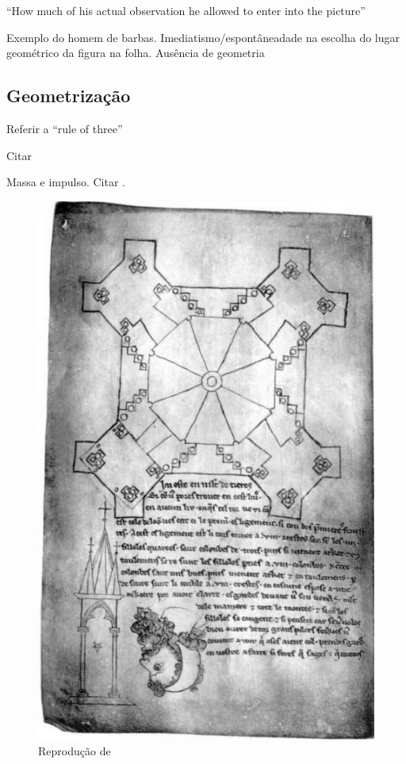 \documentclass{article}
\begin{document}
\cite{gombrich} ``How much of his actual observation he allowed to
enter into the picture''

Exemplo do homem de barbas. Imediatismo/espontâneadade na escolha do
lugar geométrico da figura na folha. Ausência de geometria 

\subsection{Geometrização}

Referir a ``rule of three''

Citar \cite{gombrich}

Massa e impulso. Citar \cite{tavora}.

\begin{figure}
\centering\includegraphics[height=0.6\textheight,keepaspectratio]{images/villard-barbicha.jpg}
  \caption{Reprodução de \citeauthor{villard-coiso-1}}
  \label{fig:villard-coiso-1}
\end{figure}
\end{document}
